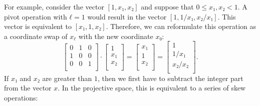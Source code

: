 \begin{center}
\end{center}

For example, consider the vector $[1, x₁, x₂]$ and suppose that $0 ≤ x₁, x₂ < 1$.
A pivot operation with $ℓ = 1$ would result in the vector $[1, 1/x₁, x₂/x₁]$.
This vector is equivalent to $[x₁, 1, x₂]$.
Therefore, we can reformulate this operation as a coordinate swap of $x_ℓ$ with
the new coordinate $x₀$:
\[
  \begin{bmatrix}
    0 & 1 & 0 \\
    1 & 0 & 0 \\
    0 & 0 & 1 \\
  \end{bmatrix}
  ·
  \begin{bmatrix} 1 \\ x₁ \\ x₂ \\ \end{bmatrix}
  =
  \begin{bmatrix} x₁ \\ 1 \\ x₂ \\ \end{bmatrix}
  =
  \begin{bmatrix} 1 \\ 1/x₁ \\ x₂/x₂ \\ \end{bmatrix}.
\]
If $x₁$ and $x₂$ are greater than $1$,
then we first have to subtract the integer part from the vector $x$.
In the projective space, this is equivalent to a series of skew operations:
